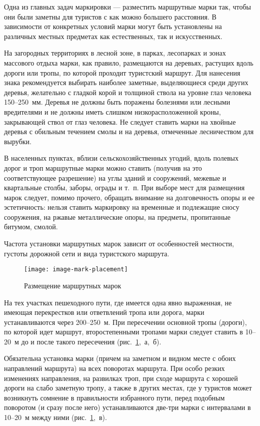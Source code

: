 \documentclass[a5paper,10pt,titlepage]{extarticle}
\begin{document}
Одна из главных задач маркировки --- разместить маршрутные марки так, чтобы они были заметны для туристов с как можно
большего расстояния. В зависимости от конкретных условий марки могут быть установлены на различных местных предметах как
естественных, так и искусственных.

На загородных территориях в лесной зоне, в парках,
лесопарках и зонах массового отдыха марки, как правило, размещаются на деревьях, растущих вдоль дороги или тропы, по
которой проходит туристский маршрут. Для нанесения знака рекомендуется выбирать наиболее заметные, выделяющиеся среди
других деревья, желательно с гладкой корой и толщиной ствола на уровне глаз человека 150--250~мм. Деревья не должны быть
поражены болезнями или лесными вредителями и не должны иметь слишком низкорасположенной кроны, закрывающей ствол от глаз
человека. Не следует ставить марки на хвойные деревья с обильным течением смолы и на деревья, отмеченные лесничеством
для вырубки.

В населенных пунктах, вблизи сельскохозяйственных угодий, вдоль полевых дорог и троп маршрутные марки можно ставить
(получив на это соответствующее разрешение) на углы зданий и сооружений, межевые и квартальные столбы, заборы, ограды и
т.~п. При выборе мест для размещения марок следует, помимо прочего, обращать внимание на долговечность опоры и ее
эстетичность: нельзя ставить маркировку на временные и подлежащие сносу сооружения, на ржавые металлические опоры, на
предметы, пропитанные битумом, смолой.

Частота установки маршрутных марок зависит от особенностей местности, густоты дорожной сети и вида туристского маршрута.

\begin{figure}
	\centering
	\texttt{[image: image-mark-placement]}
	\caption{Размещение маршрутных марок}\label{fig:mark-placement}
\end{figure}

На тех участках пешеходного пути, где имеется одна явно выраженная, не имеющая перекрестков или ответвлений тропа или
дорога, марки устанавливаются через 200--250~м. При пересечении основной тропы (дороги), по которой идет маршрут,
второстепенными тропами марки следует ставить в 10--20~м до и после такого пересечения (рис.~\ref{fig:mark-placement},~а,~б).

Обязательна установка марки (причем на заметном и видном месте с обоих направлений маршрута) на всех поворотах маршрута.
При особо резких изменениях направления, на развилках троп, при сходе маршрута с хорошей дороги на слабо заметную тропу,
а также в других местах, где у туристов может возникнуть сомнение в правильности избранного пути, перед подобным
поворотом (и сразу после него) устанавливаются две-три марки с интервалами в 10--20~м между ними (рис.~\ref{fig:mark-placement},~в).
\end{document}
